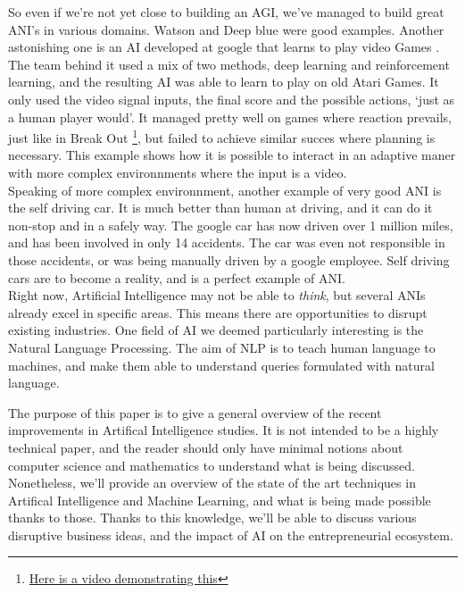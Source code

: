 \documentclass[12pt]{article}
\begin{document}
So even if we're not yet close to building an AGI, we've managed to build great
ANI's in various domains. Watson and Deep blue were good examples. Another
astonishing one is an AI developed at google that learns to play video Games
\cite{Atari}. The team behind it used a mix of two methods, deep learning and
reinforcement learning, and the resulting AI
was able to learn to play on old Atari Games. It only used the video signal
inputs, the final score and the possible actions, \lq just as a human player
would\rq. It managed pretty well on games where reaction prevails, just like in
Break Out \footnote{\href{https://www.youtube.com/watch?v=cjpEIotvwFY}
{Here is a video demonstrating this}}, but failed to achieve similar succes
where planning is necessary. This example shows how it is possible to interact
in an adaptive maner with more complex environnments where the input is a video.
\\

Speaking of more complex environnment, another example of very good ANI is the
self driving car. It is much better than human at driving, and it can do it
non-stop and in a safely way. The google car has now driven over 1 million miles,
and has been involved in only 14 accidents. The car was even not responsible in
those accidents, or was being manually driven by a google employee. Self driving
cars are to become a reality, and is a perfect example of ANI.
\\

Right now, Artificial Intelligence may not be able to {\em think}, but several
ANIs already excel in specific areas. This means there are opportunities to
disrupt existing industries. One field of AI we deemed particularly interesting
is the Natural Language Processing. The aim of NLP is to teach human language to
machines, and make them able to understand queries formulated with natural
language. 



The purpose of this paper is to give a general overview of the recent
improvements in Artifical Intelligence studies. It is not intended to be a
highly technical paper, and the reader should only have minimal notions about
computer science and mathematics to understand what is being discussed.
Nonetheless, we'll provide an overview of the state of the art
techniques in Artifical Intelligence and Machine Learning, and what is being
made possible thanks to those. Thanks to this knowledge, we'll be able to
discuss various disruptive business ideas, and the impact of AI on the
entrepreneurial ecosystem.
\\
\end{document}

